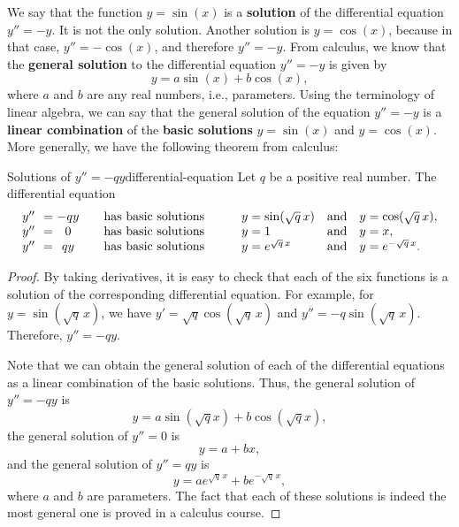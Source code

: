 We say that the function $y=\sin(x)$ is a \textbf{solution}%
 of the differential equation
$y'' = -y$. It is not the only solution. Another solution is
$y=\cos(x)$, because in that case, $y''=-\cos(x)$, and therefore
$y''=-y$. From calculus, we know that the \textbf{general solution} to
the differential equation $y'' = -y$ is given by
\begin{equation*}
  y = a\sin(x) + b\cos(x),
\end{equation*}
where $a$ and $b$ are any real numbers, i.e., parameters. Using the
terminology of linear algebra, we can say that the general solution of
the equation $y'' = -y$ is a \textbf{linear combination}%
of the \textbf{basic solutions}%
%
 $y=\sin(x)$ and
$y=\cos(x)$. More generally, we have the following theorem from
calculus:

\begin{theorem}{Solutions of $y''=-qy$}{differential-equation}
  Let $q$ be a positive real number.  The differential equation
  \begin{equation*}
    \begin{array}{l@{~~}l@{~}clllll}
    y'' &=& -qy &\quad\mbox{has basic solutions}\quad\quad &
    y = \sin(\sqrt{q}\,x) & \mbox{and} & y = \cos(\sqrt{q}\,x),\\
    y'' &=& 0 &\quad\mbox{has basic solutions}\quad\quad &
    y = 1 & \mbox{and} & y = x, \\
    y'' &=& qy &\quad\mbox{has basic solutions}\quad\quad &
    y = e^{\sqrt{q}\,x} & \mbox{and} & y = e^{-\sqrt{q}\,x}. \\
    \end{array}
  \end{equation*}
\end{theorem}

\begin{proof}
  By taking derivatives, it is easy to check that each of the six
  functions is a solution of the corresponding differential
  equation. For example, for $y=\sin(\sqrt{q}\,x)$, we have
  $y'=\sqrt{q}\cos(\sqrt{q}\,x)$ and
  $y''=-q\sin(\sqrt{q}\,x)$. Therefore, $y''=-qy$.

  Note that we can obtain the general solution of each of the
  differential equations as a linear combination of the basic
  solutions. Thus, the general solution of $y''=-qy$ is
  \begin{equation*}
      y = a\sin(\sqrt{q}x) + b\cos(\sqrt{q}x),
  \end{equation*}
  the general solution of $y''=0$ is
  \begin{equation*}
      y = a + bx,
  \end{equation*}
  and the general solution of $y''=qy$ is
  \begin{equation*}
      y = ae^{\sqrt{q}\,x} + be^{-\sqrt{q}\,x},
  \end{equation*}
  where $a$ and $b$ are parameters. The fact that each of these
  solutions is indeed the most general one is proved in a calculus
  course.
\end{proof}

